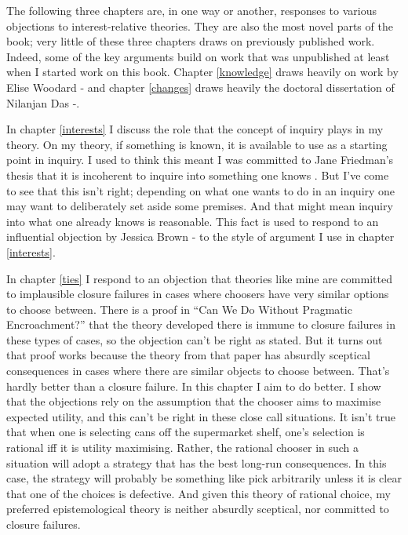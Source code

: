 \documentclass[
  11pt,
]{book}
\begin{document}
The following three chapters are, in one way or another, responses to various objections to interest-relative theories. They are also the most novel parts of the book; very little of these three chapters draws on previously published work. Indeed, some of the key arguments build on work that was unpublished at least when I started work on this book. Chapter \ref{knowledge} draws heavily on work by Elise Woodard -\citet{Woodard2021} and chapter \ref{changes} draws heavily the doctoral dissertation of Nilanjan Das -\citet{DasThesis}.

In chapter \ref{interests} I discuss the role that the concept of inquiry plays in my theory. On my theory, if something is known, it is available to use as a starting point in inquiry. I used to think this meant I was committed to Jane Friedman's thesis that it is incoherent to inquire into something one knows \citet{Friedman2019a}. But I've come to see that this isn't right; depending on what one wants to do in an inquiry one may want to deliberately set aside some premises. And that might mean inquiry into what one already knows is reasonable. This fact is used to respond to an influential objection by Jessica Brown -\citet{Brown2008} to the style of argument I use in chapter \ref{interests}.

In chapter \ref{ties} I respond to an objection that theories like mine are committed to implausible closure failures in cases where choosers have very similar options to choose between. There is a proof in ``Can We Do Without Pragmatic Encroachment?'' that the theory developed there is immune to closure failures in these types of cases, so the objection can't be right as stated. But it turns out that proof works because the theory from that paper has absurdly sceptical consequences in cases where there are similar objects to choose between. That's hardly better than a closure failure. In this chapter I aim to do better. I show that the objections rely on the assumption that the chooser aims to maximise expected utility, and this can't be right in these close call situations. It isn't true that when one is selecting cans off the supermarket shelf, one's selection is rational iff it is utility maximising. Rather, the rational chooser in such a situation will adopt a strategy that has the best long-run consequences. In this case, the strategy will probably be something like pick arbitrarily unless it is clear that one of the choices is defective. And given this theory of rational choice, my preferred epistemological theory is neither absurdly sceptical, nor committed to closure failures.
\end{document}
